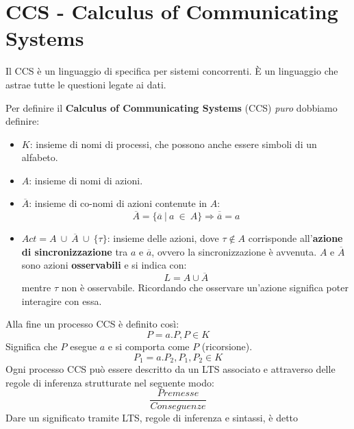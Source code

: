 \section{CCS - Calculus of Communicating Systems}
Il CCS è un linguaggio di specifica per sistemi concorrenti. È un linguaggio che
astrae tutte le questioni legate ai dati.
\begin{definizione}
    Per definire il \textbf{Calculus of Communicating Systems} (CCS) \textit{puro}
    dobbiamo definire:
    \begin{itemize}
        \item  $K$: insieme di nomi di processi, che possono anche essere
              simboli di un alfabeto.
        \item  $A$: insieme di nomi di azioni.
        \item $\overline{A}$: insieme di co-nomi di azioni contenute
              in $A$:
              \begin{equation}
                  \overline{A} = \{\overline{a} \ | \ a \ \in \ A\} \Rightarrow
                  \overline{\overline{a}} = a
              \end{equation}
        \item $Act = A \ \cup  \ \overline{A} \ \cup \ \{\tau\}$: insieme delle
              azioni, dove $\tau \notin A$ corrisponde all'\textbf{azione di
                  sincronizzazione} tra $a$ e $\overline{a}$, ovvero la
              sincronizzazione è avvenuta. $A$ e $\overline{A}$ sono azioni
              \textbf{osservabili} e si indica con: $$L = A \cup \overline{A}$$
              mentre $\tau$ non è osservabile. Ricordando che osservare un'azione
              significa poter interagire con essa.
    \end{itemize}
\end{definizione}
Alla fine un processo CCS è definito così:
\begin{equation}
    P = a.P, P \in K
\end{equation}
Significa che $P$ esegue $a$ e si comporta come $P$ (ricorsione).
\begin{equation}
    P_1 = a.P_2, P_1, P_2 \in K
\end{equation}
Ogni processo CCS può essere descritto da un LTS associato e attraverso delle
regole di inferenza strutturate nel seguente modo:
\begin{equation}
    \frac{Premesse}{Conseguenze}
\end{equation}
Dare un significato tramite LTS, regole di inferenza e sintassi, è detto
